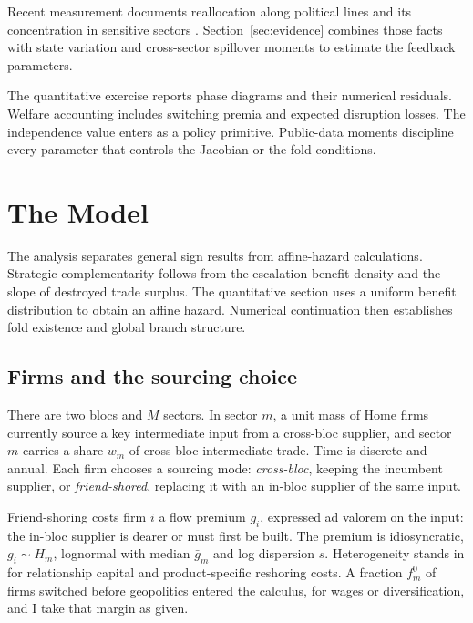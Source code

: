 \documentclass[11pt]{article}
\theoremstyle{definition}
\begin{document}
Recent measurement documents reallocation along political lines and its concentration in sensitive sectors \citep{GopinathEtAl2025JIE,FernandezVillaverdeMineyamaSong2024,AlfaroChor2023}. Section~\ref{sec:evidence} combines those facts with state variation and cross-sector spillover moments to estimate the feedback parameters.

The quantitative exercise reports phase diagrams and their numerical residuals. Welfare accounting includes switching premia and expected disruption losses. The independence value enters as a policy primitive. Public-data moments discipline every parameter that controls the Jacobian or the fold conditions.

\section{The Model}\label{sec:model}

The analysis separates general sign results from affine-hazard calculations. Strategic complementarity follows from the escalation-benefit density and the slope of destroyed trade surplus. The quantitative section uses a uniform benefit distribution to obtain an affine hazard. Numerical continuation then establishes fold existence and global branch structure.

\subsection{Firms and the sourcing choice}

There are two blocs and $M$ sectors. In sector $m$, a unit mass of Home firms currently source a key intermediate input from a cross-bloc supplier, and sector $m$ carries a share $w_m$ of cross-bloc intermediate trade. Time is discrete and annual. Each firm chooses a sourcing mode: \emph{cross-bloc}, keeping the incumbent supplier, or \emph{friend-shored}, replacing it with an in-bloc supplier of the same input.

Friend-shoring costs firm $i$ a flow premium $g_i$, expressed ad valorem on the input: the in-bloc supplier is dearer or must first be built. The premium is idiosyncratic, $g_i \sim H_m$, lognormal with median $\bar g_m$ and log dispersion $s$. Heterogeneity stands in for relationship capital and product-specific reshoring costs. A fraction $f^0_m$ of firms switched before geopolitics entered the calculus, for wages or diversification, and I take that margin as given.
\end{document}
